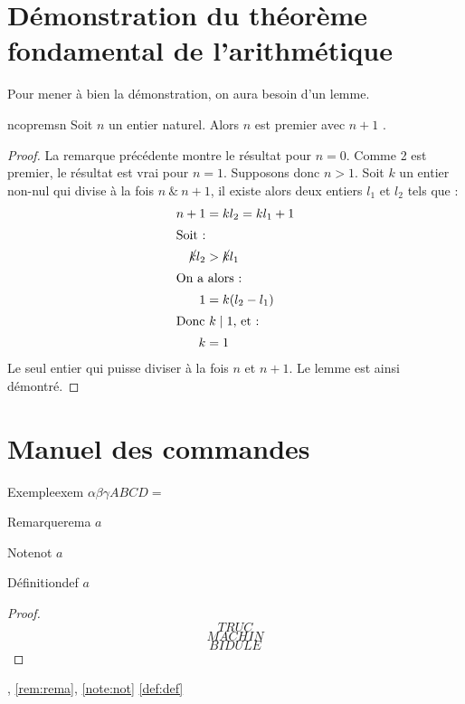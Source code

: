 \documentclass[a4paper,french,final]{memoir}
\begin{document}
\chapter{Démonstration du théorème fondamental de l'arithmétique}\label{annexe:thmfondarith}
Pour mener à bien la démonstration, on aura besoin d'un lemme. 
\begin{lemmab}{}{ncopremsn}
  Soit $n$ un entier naturel. Alors $n$ est premier avec $n+1$ .
\end{lemmab}
\begin{proof}
La remarque précédente montre le résultat pour $n=0$. Comme 2 est premier, le résultat est vrai pour $n=1$. Supposons donc $n>1$. Soit  $k$ un entier non-nul qui divise à la fois $n~\&~n+1$, il existe alors deux entiers $l_1$ et $l_2$ tels que :  
\begin{align*}
  n+1& =kl_2=kl_{1}+1\\
\shortintertext{Soit~:} 
\cancel{k}l_2& >\cancel{k}l_1\\
\shortintertext{On a alors~:} 
1& =k(l_2-l_1)\\
\intertext{Donc $k \mid 1$, et : }
k& =1
\end{align*}
Le seul entier qui puisse diviser à la fois $n$ et $n+1$. Le lemme est ainsi démontré.
\end{proof}
\chapter{Manuel des commandes}
\begin{theoremb}{Exemple}{exem}
\(\alpha\beta\gamma ABCD=\)
\end{theoremb}
\begin{remarkb}{Remarque}{rema}
\(a\)
\end{remarkb}
\begin{noteb}{Note}{not}
$a$
\end{noteb}
\begin{defb}{Définition}{def}
$a$
\end{defb}
\begin{proof}
\[TRUC\]
\proofpart{}
\[MACHIN\]
\[BIDULE\]
\end{proof}
, \cref{rem:rema}, \cref{note:not} \cref{def:def} 
\backmatter
\end{document}

